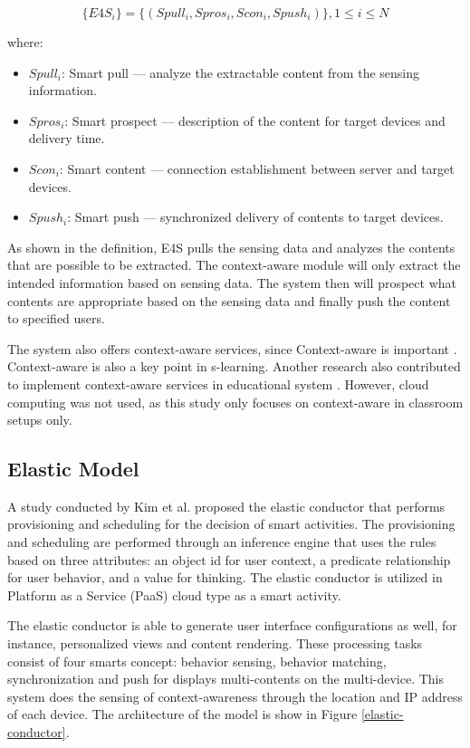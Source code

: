 \documentclass[journal]{vgtc}
\begin{document}
  \begin{equation}
    \{E4S_i\}=\{(Spull_i , Spros_i, Scon_i, Spush_i)\}, 1\leq i \leq N
  \end{equation}

  where:
  \begin{itemize}
  \setlength\itemsep{0em}
    \item[] $Spull_i$: Smart pull $—$ analyze the extractable content from the sensing information. 
    \item[] $Spros_i$: Smart prospect $—$ description of the content for target devices and delivery time.
    \item[] $Scon_i$: Smart content $—$ connection establishment between server and target devices.
    \item[] $Spush_i$: Smart push $—$ synchronized delivery of contents to target devices.
  \end{itemize}

  As shown in the definition, E4S pulls the sensing data and analyzes the contents that are possible to be extracted. The context-aware module will only extract the intended information based on sensing data. The system then will prospect what contents are appropriate based on the sensing data and finally push the content to specified users.

  The system also offers context-aware services, since Context-aware is important \cite{Pratama2014}. Context-aware is also a key point in s-learning. Another research also contributed to implement context-aware services in educational system \cite{Scott2010}. However, cloud computing was not used, as this study only focuses on context-aware in classroom setups only.

  \subsection{Elastic Model}
  A study conducted by Kim et al. \cite{Kim2013} proposed the elastic conductor that performs provisioning and scheduling for the decision of smart activities. The provisioning and scheduling are performed through an inference engine that uses the rules based on three attributes: an object id for user context, a predicate relationship for user behavior, and a value for thinking. The elastic conductor is utilized in Platform as a Service (PaaS) cloud type as a smart activity.
  
  The elastic conductor is able to generate user interface configurations as well, for instance, personalized views and content rendering. These processing tasks consist of four smarts concept: behavior sensing, behavior matching, synchronization and push for displays multi-contents on the multi-device. This system does the  sensing of context-awareness through the location and IP address of each device. The architecture of the model is show in Figure \ref{elastic-conductor}.
\end{document}

